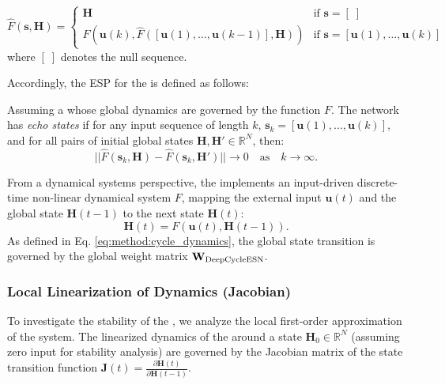 \begin{equation}
\hat{F}(\mathbf{s}, \mathbf{H}) = 
\begin{cases} 
\mathbf{H} & \text{if } \mathbf{s} = [\;] \\
F(\mathbf{u}(k), \hat{F}([\mathbf{u}(1), \dots, \mathbf{u}(k-1)], \mathbf{H})) & \text{if } \mathbf{s} = [\mathbf{u}(1), \dots, \mathbf{u}(k)]
\end{cases}
\end{equation}
where $[\;]$ denotes the null sequence.

Accordingly, the ESP for the \DCR\@ is defined as follows:

\begin{definition}
\label{def:esp_dcr}
Assuming a \DCR\@ whose global dynamics are governed by the function $F$. 
The network has \emph{echo states} if for any input sequence of length $k$, $\mathbf{s}_k = [\mathbf{u}(1), \dots, \mathbf{u}(k)]$, 
and for all pairs of initial global states $\mathbf{H}, \mathbf{H}' \in \mathbb{R}^{N}$, then:
\begin{equation}
||\hat{F}(\mathbf{s}_k, \mathbf{H}) - \hat{F}(\mathbf{s}_k, \mathbf{H}')|| \to 0 \quad \text{as} \quad k \to \infty.
\end{equation}
\end{definition}

From a dynamical systems perspective, the \DCR\@ implements an input-driven discrete-time non-linear dynamical system $F$,
 mapping the external input $\mathbf{u}(t)$ and the global state $\mathbf{H}(t-1)$ to the next state $\mathbf{H}(t)$:
\begin{equation}
    \mathbf{H}(t) = F(\mathbf{u}(t), \mathbf{H}(t-1)).
\end{equation}
As defined in Eq. \ref{eq:method:cycle_dynamics}, the global state transition is 
governed by the global weight matrix $\mathbf{W}_{\text{DeepCycleESN}}$.

\subsubsection{Local Linearization of \DCR\@ Dynamics (Jacobian)}
To investigate the stability of the \DCR\@, we analyze the local first-order approximation of the system.
The linearized dynamics of the \DCR\@ around a state $\mathbf{H}_0 \in \mathbb{R}^{N}$ (assuming zero input for stability analysis)
are governed by the Jacobian matrix of the state transition function $\mathbf{J}(t) = \frac{\partial \mathbf{H}(t)}{\partial \mathbf{H}(t-1)}$.

